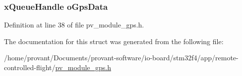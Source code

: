 \subsubsection[{\texorpdfstring{o\+Gps\+Data}{oGpsData}}]{\setlength{\rightskip}{0pt plus 5cm}x\+Queue\+Handle o\+Gps\+Data}\hypertarget{structpv__interface__gps_a4e4f88e8b52f49bd7ceae60e2660f406}{}\label{structpv__interface__gps_a4e4f88e8b52f49bd7ceae60e2660f406}


Definition at line 38 of file pv\+\_\+module\+\_\+gps.\+h.



The documentation for this struct was generated from the following file\+:\begin{DoxyCompactItemize}
\item 
/home/provant/\+Documents/provant-\/software/io-\/board/stm32f4/app/remote-\/controlled-\/flight/\hyperlink{pv__module__gps_8h}{pv\+\_\+module\+\_\+gps.\+h}\end{DoxyCompactItemize}
